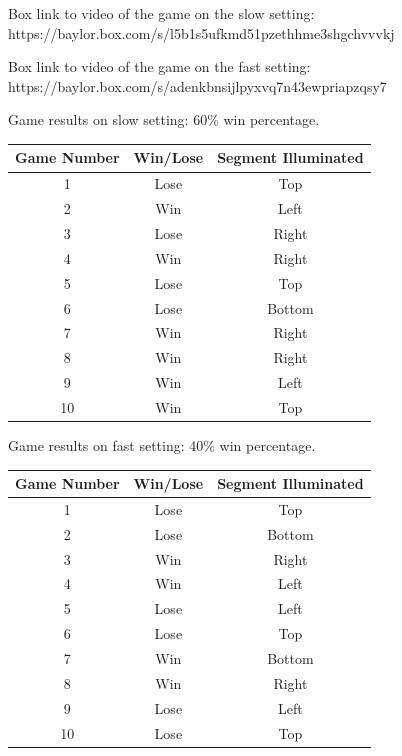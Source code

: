 \documentclass[11pt]{article}
\begin{document}
\begin{enumerate}
\item Box link to video of the game on the slow setting: 
\newline
		https://baylor.box.com/s/l5b1s5ufkmd51pzethhme3shgchvvvkj

\item Box link to video of the game on the fast setting: 
\newline
	https://baylor.box.com/s/adenkbnsijlpyxvq7n43ewpriapzqsy7
		
\begin{table}[!h]
	\centering
	\item Game results on slow setting: 60\% win percentage.
	\bigskip
	
	\begin{tabular}{c|c|c}
		Game Number & Win/Lose & Segment Illuminated  \\
		\midrule
		1 & Lose & Top \\
		2 & Win & Left \\
		3 & Lose & Right\\
		4 & Win & Right \\
		5 & Lose & Top \\
		6 & Lose & Bottom\\	
		7 & Win & Right\\
		8 & Win & Right\\
		9 & Win & Left \\
		10 & Win & Top\\
	\end{tabular}
	
	\bigskip 
	\bigskip
	\item Game results on fast setting: 40\% win percentage.
	\bigskip
	
	\begin{tabular}{c|c|c}
		Game Number & Win/Lose & Segment Illuminated  \\
		\midrule
		1 & Lose & Top \\
		2 & Lose & Bottom \\
		3 & Win & Right\\
		4 & Win & Left \\
		5 & Lose & Left \\
		6 & Lose & Top\\	
		7 & Win & Bottom\\
		8 & Win & Right\\
		9 & Lose & Left \\
		10 & Lose & Top\\
		
		
	\end{tabular}
\end{table}

		
\end{enumerate}
\end{document}
